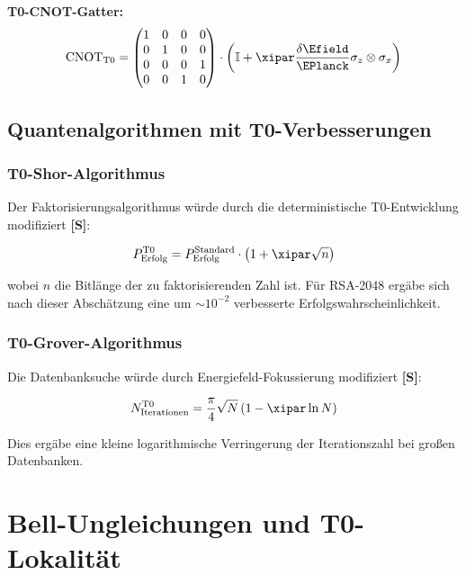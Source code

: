 	\textbf{T0-CNOT-Gatter:}
	\begin{equation}
		\text{CNOT}_{\text{T0}} = \begin{pmatrix} 1 & 0 & 0 & 0 \\ 0 & 1 & 0 & 0 \\ 0 & 0 & 0 & 1 \\ 0 & 0 & 1 & 0 \end{pmatrix} \cdot \left(\mathbb{I} + \xipar \frac{\delta\Efield}{\EPlanck} \sigma_z \otimes \sigma_x\right)
	\end{equation}
	
	\subsection{Quantenalgorithmen mit T0-Verbesserungen}
	
	\subsubsection{T0-Shor-Algorithmus}
	
	Der Faktorisierungsalgorithmus würde durch die deterministische T0-Entwicklung modifiziert \textbf{[S]}:
	
	\begin{equation}
		P_{\text{Erfolg}}^{\text{T0}} = P_{\text{Erfolg}}^{\text{Standard}} \cdot \left(1 + \xipar \sqrt{n}\right)
	\end{equation}
	
	wobei $n$ die Bitlänge der zu faktorisierenden Zahl ist. Für RSA-2048 ergäbe sich nach dieser Abschätzung eine um $\sim 10^{-2}$ verbesserte Erfolgswahrscheinlichkeit.

	
	\subsubsection{T0-Grover-Algorithmus}
	
	Die Datenbanksuche würde durch Energiefeld-Fokussierung modifiziert \textbf{[S]}:
	
	\begin{equation}
		N_{\text{Iterationen}}^{\text{T0}} = \frac{\pi}{4}\sqrt{N} \left(1 - \xipar \ln N\right)
	\end{equation}
	
	Dies ergäbe eine kleine logarithmische Verringerung der Iterationszahl bei großen Datenbanken.
	
	\section{Bell-Ungleichungen und T0-Lokalität}
	
